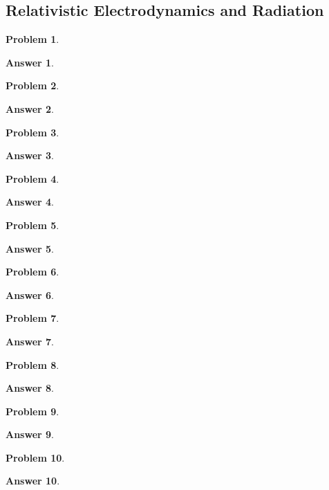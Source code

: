 \documentclass[a4paper]{article}
\newtheorem{ans}{Answer}[section]
\theoremstyle{new}
\newtheorem{qns}{Problem}[section]
\begin{document}
\subsection*{Relativistic Electrodynamics and Radiation}
\begin{qns}

\end{qns}
\begin{ans}

\end{ans}
\begin{qns}

\end{qns}
\begin{ans}

\end{ans}
\newpage
\begin{qns}

\end{qns}
\begin{ans}

\end{ans}
\begin{qns}

\end{qns}
\begin{ans}

\end{ans}
\newpage
\begin{qns}

\end{qns}
\begin{ans}

\end{ans}
\begin{qns}

\end{qns}
\begin{ans}

\end{ans}
\newpage
\begin{qns}

\end{qns}
\begin{ans}

\end{ans}
\begin{qns}

\end{qns}
\begin{ans}

\end{ans}
\newpage
\begin{qns}

\end{qns}
\begin{ans}

\end{ans}
\begin{qns}

\end{qns}
\begin{ans}

\end{ans}
\end{document}
